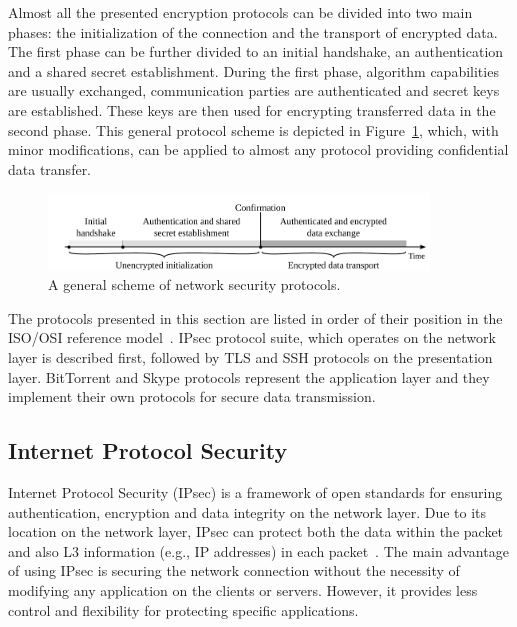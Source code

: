 Almost all the presented encryption protocols can be divided into two main phases: the initialization of the connection and the transport of encrypted data. The first phase can be further divided to an initial handshake, an authentication and a shared secret establishment. During the first phase, algorithm capabilities are usually exchanged, communication parties are authenticated and secret keys are established. These keys are then used for encrypting transferred data in the second phase. This general protocol scheme is depicted in Figure~\ref{fig:protocols-scheme}, which, with minor modifications, can be applied to almost any protocol providing confidential data transfer.

\begin{figure}[!ht]
	\begin{center}
		\includegraphics[width=0.9\textwidth]{figures/protocols_scheme}
		\caption{A general scheme of network security protocols.} \label{fig:protocols-scheme}
	\end{center}
\end{figure}

The protocols presented in this section are listed in order of their position in the ISO/OSI reference model~\cite{ISO7948-1}. IPsec protocol suite, which operates on the network layer is described first, followed by TLS and SSH protocols on the presentation layer. BitTorrent and Skype protocols represent the application layer and they implement their own protocols for secure data transmission.



\subsection{Internet Protocol Security}

Internet Protocol Security (IPsec) is a framework of open standards for ensuring authentication, encryption and data integrity on the network layer. Due to its location on the network layer, IPsec can protect both the data within the packet and also L3 information (e.g., IP addresses) in each packet~\cite{SP-800-77}. The main advantage of using IPsec is securing the network connection without the necessity of modifying any application on the clients or servers. However, it provides less control and flexibility for protecting specific applications.

